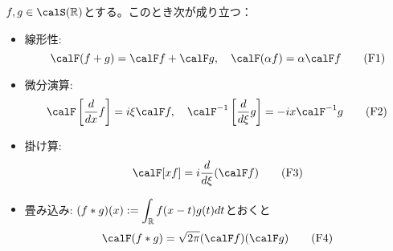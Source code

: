 \documentclass[report]{jlreq}
\begin{document}
\begin{theorem}
    $f, g \in \calS(\R)$とする。このとき次が成り立つ：
    \begin{itemize}
        \item 線形性:
            \begin{equation}
                \calF (f + g) = \calF f + \calF g, \quad \calF (\alpha f) = \alpha \calF f
                \tag{F1}
            \end{equation}
        \item 微分演算:
            \begin{equation}
                \calF \left[\dd{x} f\right] = i\xi\calF f,
                \quad \calF^{-1}\left[\dd{\xi} g\right] = -ix\calF^{-1} g
                \tag{F2}
            \end{equation}
        \item 掛け算:
            \begin{equation}
                \calF [xf] = i \dd{\xi} (\calF f)
                \tag{F3}
            \end{equation}
        \item 畳み込み\footnotemark: $\displaystyle (f * g)(x) := \int_{\mathbb{R}} f(x - t) g(t) dt$とおくと
            \begin{equation}
                \calF (f * g) = \sqrt{2 \pi} (\calF f) (\calF g)
                \tag{F4}
            \end{equation}
    \end{itemize}
\end{theorem}

\end{document}
